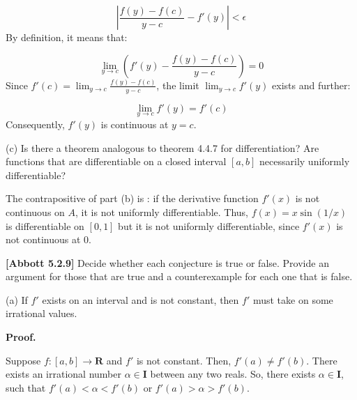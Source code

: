 \documentclass[10pt]{article}
\begin{document}
\begin{equation*}
\left| \frac{f( y) -f( c)}{y-c} -f'( y)\right| < \epsilon 
\end{equation*}
By definition, it means that:


\begin{equation*}
\lim _{y\rightarrow c}\left( f'( y) -\frac{f( y) -f( c)}{y-c}\right) =0
\end{equation*}
Since $\displaystyle f'( c) =\lim _{y\rightarrow c}\frac{f( y) -f( c)}{y-c}$, the limit $\displaystyle \lim _{y\rightarrow c} f'( y)$ exists and further:


\begin{equation*}
\lim _{y\rightarrow c} f'( y) =f'( c)
\end{equation*}
Consequently, $\displaystyle f'( y)$ is continuous at $\displaystyle y=c$.



(c) Is there a theorem analogous to theorem 4.4.7 for differentiation? Are functions that are differentiable on a closed interval $\displaystyle [ a,b]$ necessarily uniformly differentiable?



The contrapositive of part (b) is : if the derivative function $\displaystyle f'( x)$ is not continuous on $\displaystyle A$, it is not uniformly differentiable. Thus, $\displaystyle f( x) =x\sin( 1/x)$ is differentiable on $\displaystyle [ 0,1]$ but it is not uniformly differentiable, since $\displaystyle f'( x)$ is not continuous at $\displaystyle 0$. 



\textbf{[Abbott 5.2.9]} Decide whether each conjecture is true or false. Provide an argument for those that are true and a counterexample for each one that is false.



(a) If $\displaystyle f'$ exists on an interval and is not constant, then $\displaystyle f'$ must take on some irrational values.



\textbf{Proof.}



Suppose $\displaystyle f:[ a,b]\rightarrow \mathbf{R}$ and $\displaystyle f'$ is not constant. Then, $\displaystyle f'( a) \neq f'( b)$. There exists an irrational number $\displaystyle \alpha \in \mathbf{I}$ between any two reals. So, there exists $\displaystyle \alpha \in \mathbf{I}$, such that $\displaystyle f'( a) < \alpha < f'( b)$ or $\displaystyle f'( a)  >\alpha  >f'( b)$.
\end{document}
